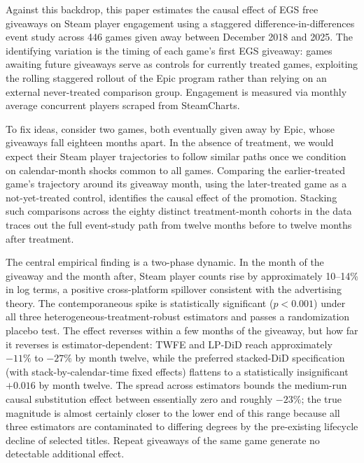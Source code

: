 \documentclass[11pt]{article}
\begin{document}
Against this backdrop, this paper estimates the causal effect of EGS free giveaways on
Steam player engagement using a staggered difference-in-differences event study across
446 games given away between December 2018 and 2025. The identifying variation is the
timing of each game's first EGS giveaway: games awaiting future giveaways
serve as controls for currently treated games, exploiting the rolling staggered rollout
of the Epic program rather than relying on an external never-treated comparison group.
Engagement is measured via monthly average concurrent players scraped from SteamCharts.

To fix ideas, consider two games, both eventually given away by Epic, whose
giveaways fall eighteen months apart. In the absence of treatment, we would expect
their Steam player trajectories to follow similar paths once we condition on
calendar-month shocks common to all games. Comparing the earlier-treated game's
trajectory around its giveaway month, using the later-treated game as a not-yet-treated
control, identifies the causal effect of the promotion. Stacking such comparisons
across the eighty distinct treatment-month cohorts in the data traces out the full
event-study path from twelve months before to twelve months after treatment.

The central empirical finding is a two-phase dynamic. In the month of the giveaway and
the month after, Steam player counts rise by approximately 10--14\% in log terms, a
positive cross-platform spillover consistent with the advertising theory.
The contemporaneous spike is statistically significant ($p<0.001$) under all three
heterogeneous-treatment-robust estimators and passes a randomization placebo test.
The effect reverses within a few months of the giveaway, but how far it reverses is
estimator-dependent: TWFE and LP-DiD reach approximately $-11\%$ to $-27\%$ by month
twelve, while the preferred stacked-DiD specification (with stack-by-calendar-time
fixed effects) flattens to a statistically insignificant $+0.016$ by month twelve.
The spread across estimators bounds the medium-run causal substitution effect
between essentially zero and roughly $-23\%$; the true magnitude is almost certainly
closer to the lower end of this range because all three estimators are contaminated
to differing degrees by the pre-existing lifecycle decline of selected titles.
Repeat giveaways of the same game generate no detectable additional effect.
\end{document}
